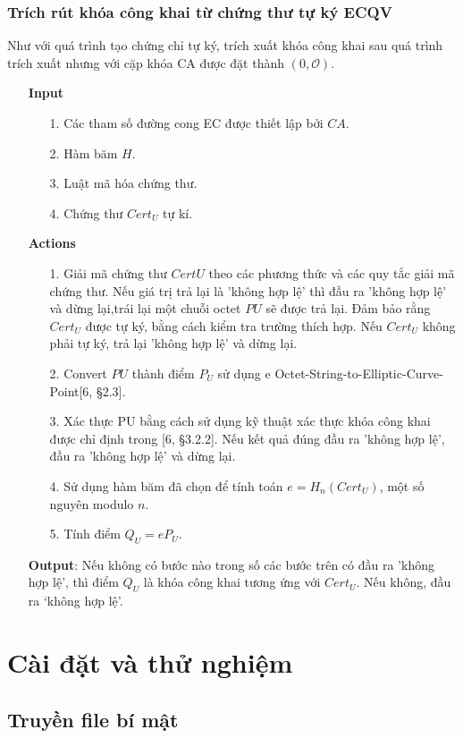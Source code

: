 \documentclass[a4paper,12pt]{report}
\begin{document}
\subsection{Trích rút khóa công khai từ chứng thư tự ký ECQV}
Như với quá trình tạo chứng chỉ tự ký, trích xuất khóa công khai sau quá trình trích xuất nhưng với cặp khóa CA được đặt thành $(0, \mathcal{O})$.
\begin{itemize}
\item[] \textbf{Input}
\begin{itemize}
\item[1. ] Các tham số đường cong EC được thiết lập bởi $CA$.
\item[2. ] Hàm băm $H$.
\item[3. ] Luật mã hóa chứng thư.
\item[4. ] Chứng thư $Cert_U$ tự kí.
\end{itemize}
\item[] \textbf{Actions}
\begin{itemize}
\item[1. ] Giải mã chứng thư $CertU$ theo các phương thức và các quy tắc giải mã chứng thư. Nếu giá trị trả lại là 'không hợp lệ' thì đầu ra 'không hợp lệ' và dừng lại,trái lại một chuỗi octet $PU$ sẽ được trả lại. Đảm bảo rằng $Cert_U$ được tự ký, bằng cách kiểm tra trường thích hợp. Nếu $Cert_U$ không phải tự ký, trả lại 'không hợp lệ' và dừng lại.
\item[2. ] Convert $PU$ thành điểm $P_U$ sử dụng e Octet-String-to-Elliptic-Curve-Point[6, §2.3].
\item[3. ] Xác thực PU bằng cách sử dụng kỹ thuật xác thực khóa công khai được chỉ định trong [6, §3.2.2]. Nếu kết quả đúng đầu ra 'không hợp lệ', đầu ra 'không hợp lệ' và dừng lại.
\item[4. ] Sử dụng hàm băm đã chọn để tính toán $e = H_n(Cert_U)$, một số nguyên modulo $n$.
\item[5. ] Tính điểm $Q_U = eP_U$.
\end{itemize}
\item[] \textbf{Output}: Nếu không có bước nào trong số các bước trên có đầu ra 'không hợp lệ', thì điểm $Q_U$ là khóa công khai tương ứng với $Cert_U$. Nếu không, đầu ra ‘không hợp lệ’.
\end{itemize}
\chapter{Cài đặt và thử nghiệm}
\section{Truyền file bí mật}
\end{document}
